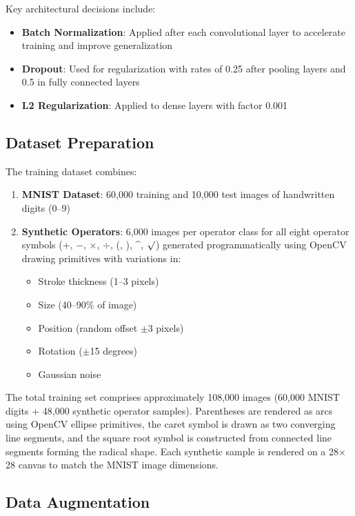 \documentclass[conference]{IEEEtran}
\begin{document}
Key architectural decisions include:

\begin{itemize}
    \item \textbf{Batch Normalization}: Applied after each convolutional layer to accelerate training and improve generalization
    \item \textbf{Dropout}: Used for regularization with rates of 0.25 after pooling layers and 0.5 in fully connected layers
    \item \textbf{L2 Regularization}: Applied to dense layers with factor 0.001
\end{itemize}

\subsection{Dataset Preparation}

The training dataset combines:

\begin{enumerate}
    \item \textbf{MNIST Dataset}: 60,000 training and 10,000 test images of handwritten digits (0--9)
    \item \textbf{Synthetic Operators}: 6,000 images per operator class for all eight operator symbols (+, $-$, $\times$, $\div$, (, ), \^{}, $\surd$) generated programmatically using OpenCV drawing primitives with variations in:
    \begin{itemize}
        \item Stroke thickness (1--3 pixels)
        \item Size (40--90\% of image)
        \item Position (random offset $\pm$3 pixels)
        \item Rotation ($\pm$15 degrees)
        \item Gaussian noise
    \end{itemize}
\end{enumerate}

The total training set comprises approximately 108,000 images (60,000 MNIST digits + 48,000 synthetic operator samples). Parentheses are rendered as arcs using OpenCV ellipse primitives, the caret symbol is drawn as two converging line segments, and the square root symbol is constructed from connected line segments forming the radical shape. Each synthetic sample is rendered on a 28$\times$28 canvas to match the MNIST image dimensions.

\subsection{Data Augmentation}
\end{document}
